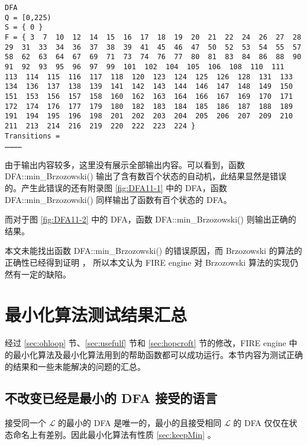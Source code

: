 \begin{lstlisting}
DFA
Q = [0,225)
S = { 0 }
F = { 3  7  10  12  14  15  16  17  18  19  20  21  22  24  26  27  28  29  31  33  34  36  37  38  39  41  45  46  47  50  52  53  54  55  57  58  62  63  64  67  69  71  73  74  76  77  80  81  83  84  86  88  90  91  92  93  95  96  97  99  101  102  104  105  106  108  110  111  113  114  115  116  117  118  120  123  124  125  126  128  131  133  134  136  137  138  139  141  142  143  144  146  147  148  149  150  151  153  156  157  158  160  162  163  164  166  167  169  170  171  172  174  176  177  179  180  182  183  184  185  186  187  188  189  191  194  195  196  198  201  202  203  204  205  206  207  209  210  211  213  214  216  219  220  222  223  224 }
Transitions =
…………
\end{lstlisting}

由于输出内容较多，这里没有展示全部输出内容。可以看到，函数 DFA::min\_Brzozowski() 输出了含有数百个状态的自动机，此结果显然是错误的。产生此错误的还有附录图 \ref{fig:DFA11-1} 中的 DFA，函数 DFA::min\_Brzozowski() 同样输出了函数有百个状态的 DFA。

而对于图 \ref{fig:DFA11-2} 中的 DFA，函数 DFA::min\_Brzozowski() 则输出正确的结果。

本文未能找出函数 DFA::min\_Brzozowski() 的错误原因，而 Brzozowski 的算法的正确性已经得到证明\cite{watson1993taxonomyb} ， 所以本文认为 FIRE engine 对 Brzozowski 算法的实现仍然有一定的缺陷。

\section{最小化算法测试结果汇总}\label{sec:listall}

经过 \ref{sec:ohloop} 节、\ref{sec:usefulf} 节和 \ref{sec:hopcroft} 节的修改，FIRE engine 中的最小化算法及最小化算法用到的帮助函数都可以成功运行。本节内容为测试正确的结果和一些未能解决的问题的汇总。

\subsection{不改变已经是最小的 DFA 接受的语言}

接受同一个 $\mathcal{L}$ 的最小的 DFA 是唯一的，最小的且接受相同 $\mathcal{L}$ 的 DFA 仅仅在状态命名上有差别\cite{book1}。因此最小化算法有性质 \ref{sec:keepMin} 。

